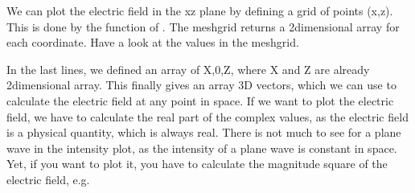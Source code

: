 \documentclass[letterpaper,10pt,english]{sphinxmanual}
\begin{document}
{
\begin{sphinxVerbatim}[commandchars=\\\{\}]
\llap{\color{nbsphinxin}[5]:\,\hspace{\fboxrule}\hspace{\fboxsep}}\PYG{p}{[}\PYG{p}{]}

\end{sphinxVerbatim}
}

We can plot the electric field in the x\sphinxhyphen{}z plane by defining a grid of points (x,z). This is done by the  function of . The meshgrid returns a 2\sphinxhyphen{}dimensional array for each coordinate. Have a look at the values in the meshgrid.

{
\begin{sphinxVerbatim}[commandchars=\\\{\}]
\llap{\color{nbsphinxin}[6]:\,\hspace{\fboxrule}\hspace{\fboxsep}}

\PYG{p}{[}\PYG{p}{]}
\end{sphinxVerbatim}
}

In the last lines, we defined an array of X,0,Z, where X and Z are already 2\sphinxhyphen{}dimensional array. This finally gives an array 3D vectors, which we can use to calculate the electric field at any point in space. If we want to plot the electric field, we have to calculate the real part of the complex values, as the electric field is a physical quantity, which is always real. There is not much to see for a plane wave in the intensity plot, as the intensity of a plane wave is constant in space. Yet, if
you want to plot it, you have to calculate the magnitude square of the electric field, e.g.
\end{document}
